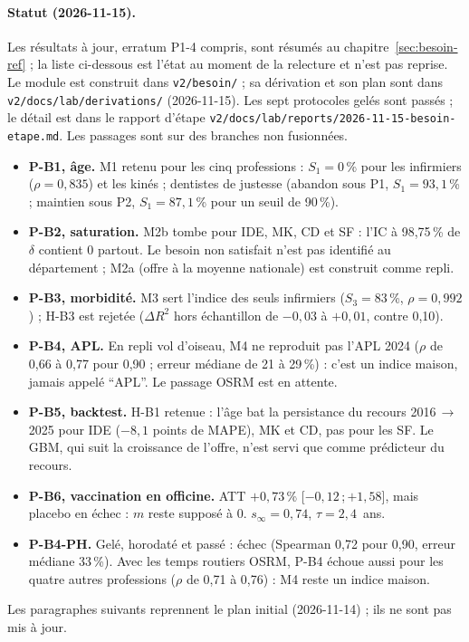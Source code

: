 \paragraph{Statut (2026-11-15).}
Les résultats à jour, erratum P1-4 compris, sont résumés au chapitre~\ref{sec:besoin-ref} ; la liste ci-dessous est l'état au moment de la relecture et n'est pas reprise.
Le module est construit dans \texttt{v2/\allowbreak{}besoin/\allowbreak{}} ; sa dérivation et son plan sont dans \texttt{v2/\allowbreak{}docs/\allowbreak{}lab/\allowbreak{}derivations/\allowbreak{}} (2026-11-15).
Les sept protocoles gelés sont passés ; le détail est dans le rapport d'étape \texttt{v2/\allowbreak{}docs/\allowbreak{}lab/\allowbreak{}reports/\allowbreak{}2026-\allowbreak{}11-\allowbreak{}15-\allowbreak{}besoin-\allowbreak{}etape.md}. Les passages sont sur des branches non fusionnées.
\begin{itemize}
\item \textbf{P-B1, âge.} M1 retenu pour les cinq professions : $S_1=0$\mesure{}\,\% pour les infirmiers ($\rho=0{,}835$\mesure{}) et les kinés ; dentistes de justesse (abandon sous P1, $S_1=93{,}1$\mesure{}\,\% ; maintien sous P2, $S_1=87{,}1$\mesure{}\,\% pour un seuil de 90\suppose{}\,\%).
\item \textbf{P-B2, saturation.} M2b tombe pour IDE, MK, CD et SF : l'IC à 98,75\,\% de $\delta$ contient 0 partout. Le besoin non satisfait n'est pas identifié au département ; M2a (offre à la moyenne nationale) est construit comme repli.
\item \textbf{P-B3, morbidité.} M3 sert l'indice des seuls infirmiers ($S_3=83$\mesure{}\,\%, $\rho=0{,}992$\mesure{}) ; H-B3 est rejetée ($\Delta R^2$ hors échantillon de $-0{,}03$ à $+0{,}01$\mesure{}, contre 0,10\suppose{}).
\item \textbf{P-B4, APL.} En repli vol d'oiseau, M4 ne reproduit pas l'APL 2024 ($\rho$ de 0,66 à 0,77\mesure{} pour 0,90\suppose{} ; erreur médiane de 21 à 29\mesure{}\,\%) : c'est un indice maison, jamais appelé \enquote{APL}. Le passage OSRM est en attente.
\item \textbf{P-B5, backtest.} H-B1 retenue : l'âge bat la persistance du recours 2016\,$\to$\,2025 pour IDE ($-8{,}1$\mesure{} points de MAPE), MK et CD, pas pour les SF. Le GBM, qui suit la croissance de l'offre, n'est servi que comme prédicteur du recours.
\item \textbf{P-B6, vaccination en officine.} ATT $+0{,}73$\mesure{}\,\% [$-0{,}12$\,;\,$+1{,}58$], mais placebo en échec : $m$ reste supposé à 0. $s_\infty=0{,}74$\derive{}, $\tau=2{,}4$\derive{}~ans.
\item \textbf{P-B4-PH.} Gelé, horodaté et passé : échec (Spearman 0,72\mesure{} pour 0,90\suppose{}, erreur médiane 33\mesure{}\,\%). Avec les temps routiers OSRM, P-B4 échoue aussi pour les quatre autres professions ($\rho$ de 0,71 à 0,76\mesure{}) : M4 reste un indice maison.
\end{itemize}
Les paragraphes suivants reprennent le plan initial (2026-11-14) ; ils ne sont pas mis à jour.

